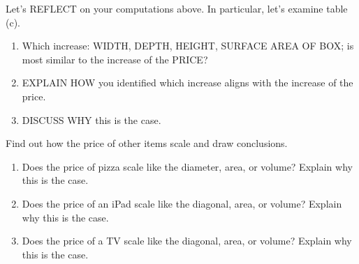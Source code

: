 \documentclass[nooutcomes,noauthor,handout,12pt]{ximera}
\begin{document}




\begin{question}
  Let's REFLECT on your computations above. In particular, let's
  examine table (c).%
  \begin{enumerate}
    \item Which increase: WIDTH, DEPTH, HEIGHT, SURFACE AREA OF BOX;
      is most similar to the increase of the PRICE?
    \item EXPLAIN HOW you identified which increase aligns with the
      increase of the price.
    \item DISCUSS WHY this is the case.
  \end{enumerate}
\end{question}
\mynewpage


\begin{question}
  Find out how the price of other items scale and draw conclusions.
  \begin{enumerate}
  \item Does the price of pizza scale like the diameter, area, or
    volume?  Explain why this is the case.
  \item Does the price of an iPad scale like the diagonal, area, or
    volume? Explain why this is the case.
  \item Does the price of a TV scale like the diagonal, area, or
    volume? Explain why this is the case.
  \end{enumerate}
\end{question}
\end{document}
